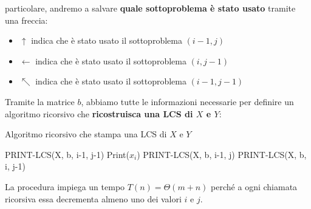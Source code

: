 \documentclass[12pt]{article}
\begin{document}
particolare, andremo a salvare \textbf{quale sottoproblema è stato usato} tramite una freccia:
\begin{itemize}
    \item $\uparrow$ indica che è stato usato il sottoproblema $(i-1, j)$
    \item $\leftarrow$ indica che è stato usato il sottoproblema $(i, j-1)$
    \item $\nwarrow$ indica che è stato usato il sottoproblema $(i-1, j-1)$
\end{itemize}
Tramite la matrice $b$, abbiamo tutte le informazioni necessarie per definire un algoritmo ricorsivo che
\textbf{ricostruisca una LCS di $X$ e $Y$}: \newline
\begin{algorithm}[H]
    \caption{Algoritmo ricorsivo che stampa una LCS di $X$ e $Y$}
    \DontPrintSemicolon
     {
         {
             {
                PRINT-LCS(X, b, i-1, j-1) \;
                Print($x_i$) \;
            } {
                 {
                    PRINT-LCS(X, b, i-1, j)\;
                } {
                    PRINT-LCS(X, b, i, j-1)\;
                }
            }
        }
    }
\end{algorithm}\noindent
La procedura impiega un tempo $T(n) = \Theta(m + n)$ perché a ogni chiamata ricorsiva essa decrementa almeno uno dei valori $i$ e $j$.
\end{document}
